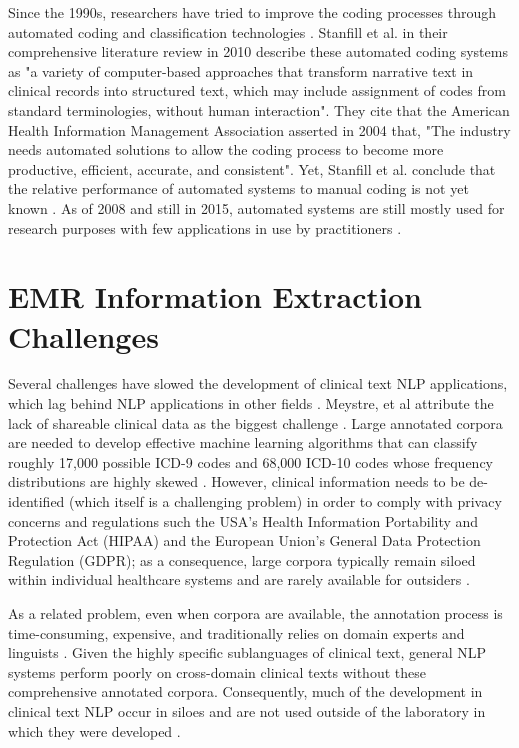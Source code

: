 \documentclass[sigconf]{acmart}
\begin{document}
Since the 1990s, researchers have tried to improve the coding processes through automated coding and classification technologies \cite{kavuluru2013unsupervised}. Stanfill et al. in their comprehensive literature review in 2010 describe these automated coding systems as "a variety of computer-based approaches that transform narrative text in clinical records into structured text, which may include assignment of codes from standard terminologies, without human interaction". They cite that the American Health Information Management Association asserted in 2004 that, "The industry needs automated solutions to allow the coding process to become more productive, efficient, accurate, and consistent". Yet, Stanfill et al. conclude that the relative performance of automated systems to manual coding is not yet known \cite{stanfill2010systematic}. As of 2008 and still in 2015, automated systems are still mostly used for research purposes with few applications in use by practitioners \cite{meystre2008extracting} \cite{velupillai2015recent}. 



\section{EMR Information Extraction Challenges}
Several challenges have slowed the development of clinical text NLP applications, which lag behind NLP applications in other fields \cite{chapman2011overcoming}. Meystre, et al attribute the lack of shareable clinical data as the biggest challenge \cite{meystre2008extracting}. Large annotated corpora are needed to develop effective machine learning algorithms that can classify roughly 17,000 possible ICD-9 codes and 68,000 ICD-10 codes whose frequency distributions are highly skewed \cite{berndorfer2017automated}. However, clinical information needs to be de-identified (which itself is a challenging problem) in order to comply with privacy concerns and regulations such the USA's Health Information Portability and Protection Act (HIPAA) and the European Union's General Data Protection Regulation (GDPR); as a consequence, large corpora typically remain siloed within individual healthcare systems and are rarely available for outsiders \cite{meystre2008extracting} \cite{stanfill2010systematic}.

As a related problem, even when corpora are available, the annotation process is time-consuming, expensive, and traditionally relies on domain experts and linguists \cite{meystre2008extracting} \cite{velupillai2015recent}. Given the highly specific sublanguages of clinical text, general NLP systems perform poorly on cross-domain clinical texts without these comprehensive annotated corpora. Consequently, much of the development in clinical text NLP occur in siloes and are not used outside of the laboratory in which they were developed \cite{chapman2011overcoming}.
\end{document}
